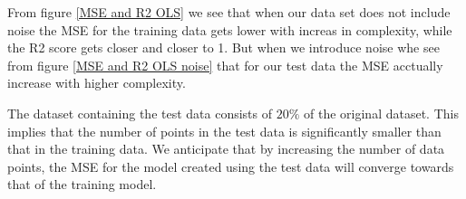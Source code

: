 \thispagestyle{plain}

\noindent From figure \eqref{MSE and R2 OLS} we see that when our data set does not include noise
the MSE for the training data gets lower with increas in complexity, while 
the R2 score gets closer and closer to 1. But when we introduce noise whe see from figure \eqref{MSE and R2 OLS noise}
that for our test data the MSE acctually increase with higher complexity. 

The dataset containing the test data consists of $20\%$ of the original
dataset. This implies that the number of points in the test data is 
significantly smaller than that in the training data. We anticipate 
that by increasing the number of data points, the MSE for the model 
created using the test data will converge towards that of the training
model.